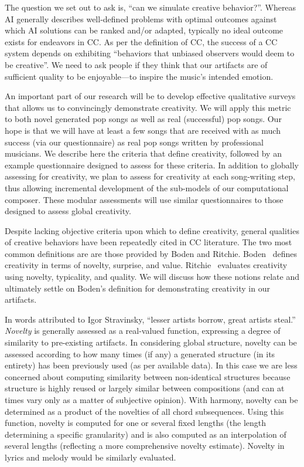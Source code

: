 \documentclass[11pt,phd]{byuprop}
\begin{document}

The question we set out to ask is, ``can we simulate creative behavior?''. Whereas AI generally describes well-defined problems with optimal outcomes against which AI solutions can be ranked and/or adapted, typically no ideal outcome exists for endeavors in CC. As per the definition of CC, the success of a CC system depends on exhibiting ``behaviors that unbiased observers would deem to be creative''. We need to ask people if they think that our artifacts are of sufficient quality to be enjoyable---to inspire the music's intended emotion. 

An important part of our research will be to develop effective qualitative surveys that allows us to convincingly demonstrate creativity. We will apply this metric to both novel generated pop songs as well as real (successful) pop songs. Our hope is that we will have at least a few songs that are received with as much success (via our questionnaire) as real pop songs written by professional musicians. We describe here the criteria that define creativity, followed by an example questionnaire designed to assess for these criteria. In addition to globally assessing for creativity, we plan to assess for creativity at each song-writing step, thus allowing incremental development of the sub-models of our computational composer. These modular assessments will use similar questionnaires to those designed to assess global creativity.

Despite lacking objective criteria upon which to define creativity, general qualities of creative behaviors have been repeatedly cited in CC literature. The two most common definitions are are those provided by Boden and Ritchie. Boden~\cite{boden2004creative} defines creativity in terms of novelty, surprise, and value. Ritchie~\cite{ritchie2007some} evaluates creativity using novelty, typicality, and quality. We will discuss how these notions relate and ultimately settle on Boden's definition for demonstrating creativity in our artifacts.

In words attributed to Igor Stravinsky, ``lesser artists borrow, great artists steal.'' \emph{Novelty} is generally assessed as a real-valued function, expressing a degree of similarity to pre-existing artifacts. In considering global structure, novelty can be assessed according to how many times (if any) a generated structure (in its entirety) has been previously used (as per available data). In this case we are less concerned about computing similarity between non-identical structures because structure is highly reused or largely similar between compositions (and can at times vary only as a matter of subjective opinion). With harmony, novelty can be determined as a product of the novelties of all chord subsequences. Using this function, novelty is computed for one or several fixed lengths (the length determining a specific granularity) and is also computed as an interpolation of several lengths (reflecting a more comprehensive novelty estimate). Novelty in lyrics and melody would be similarly evaluated.
\end{document}
